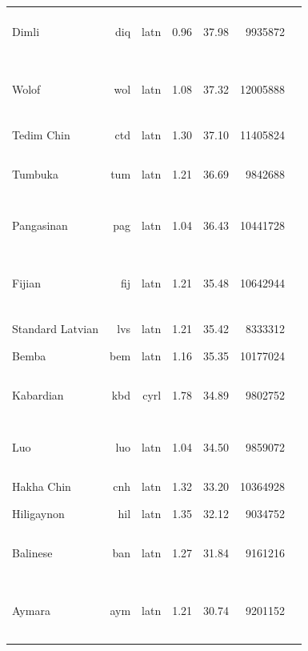 \documentclass[11pt]{article}
\begin{document}
\begin{center}
\begin{longtable}[width=0.9\textwidth]{|lrrrrrl|}
Dimli & diq & latn & 0.96 & 37.98 & 9935872 & {\color{nllb}\rule{2.08cm}{8pt}}{\color{glot500}\rule{1.21cm}{8pt}}{\color{other}\rule{0.71cm}{8pt}} \\ 
Wolof & wol & latn & 1.08 & 37.32 & 12005888 & {\color{nllb}\rule{2.53cm}{8pt}}{\color{madlad400}\rule{0.33cm}{8pt}}{\color{glot500}\rule{0.68cm}{8pt}}{\color{other}\rule{0.45999999999999996cm}{8pt}} \\ 
Tedim Chin & ctd & latn & 1.30 & 37.10 & 11405824 & {\color{madlad400}\rule{4.0cm}{8pt}} \\ 
Tumbuka & tum & latn & 1.21 & 36.69 & 9842688 & {\color{nllb}\rule{3.3cm}{8pt}}{\color{glot500}\rule{0.1cm}{8pt}}{\color{other}\rule{0.6000000000000001cm}{8pt}} \\ 
Pangasinan & pag & latn & 1.04 & 36.43 & 10441728 & {\color{nllb}\rule{3.88cm}{8pt}}{\color{glot500}\rule{0.09cm}{8pt}}{\color{other}\rule{0.03000000000000025cm}{8pt}} \\ 
Fijian & fij & latn & 1.21 & 35.48 & 10642944 & {\color{nllb}\rule{2.14cm}{8pt}}{\color{madlad400}\rule{1.74cm}{8pt}}{\color{glot500}\rule{0.1cm}{8pt}}{\color{other}\rule{0.020000000000000018cm}{8pt}} \\ 
Standard Latvian & lvs & latn & 1.21 & 35.42 & 8333312 & {\color{glot500}\rule{4.0cm}{8pt}} \\ 
Bemba & bem & latn & 1.16 & 35.35 & 10177024 & {\color{nllb}\rule{4.0cm}{8pt}}{\color{glot500}\rule{0.0cm}{8pt}} \\ 
Kabardian & kbd & cyrl & 1.78 & 34.89 & 9802752 & {\color{madlad400}\rule{2.37cm}{8pt}}{\color{glot500}\rule{0.12cm}{8pt}}{\color{other}\rule{1.5099999999999998cm}{8pt}} \\ 
Luo & luo & latn & 1.04 & 34.50 & 9859072 & {\color{nllb}\rule{3.56cm}{8pt}}{\color{glot500}\rule{0.06cm}{8pt}}{\color{other}\rule{0.3799999999999999cm}{8pt}} \\ 
Hakha Chin & cnh & latn & 1.32 & 33.20 & 10364928 & {\color{madlad400}\rule{4.0cm}{8pt}} \\ 
Hiligaynon & hil & latn & 1.35 & 32.12 & 9034752 & {\color{madlad400}\rule{4.0cm}{8pt}}{\color{glot500}\rule{0.0cm}{8pt}}{\color{other}\rule{0.0cm}{8pt}} \\ 
Balinese & ban & latn & 1.27 & 31.84 & 9161216 & {\color{nllb}\rule{2.8cm}{8pt}}{\color{glot500}\rule{0.46cm}{8pt}}{\color{other}\rule{0.7400000000000002cm}{8pt}} \\ 
Aymara & aym & latn & 1.21 & 30.74 & 9201152 & {\color{nllb}\rule{2.45cm}{8pt}}{\color{madlad400}\rule{0.98cm}{8pt}}{\color{glot500}\rule{0.29cm}{8pt}}{\color{other}\rule{0.2799999999999998cm}{8pt}} \\ 

\end{longtable}
\end{center}
\end{document}
